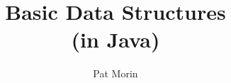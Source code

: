 \documentclass{book}
\title{Basic Data Structures\\(in Java)}
\author{Pat Morin}
\begin{document}
\begin{titlepage}
\maketitle
\thispagestyle{empty}
\end{titlepage}

\tableofcontents


\end{document}
